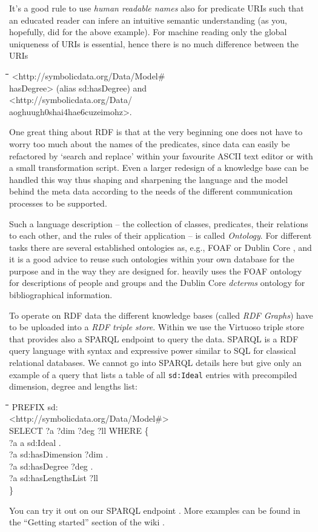 \documentclass[a4paper,11pt]{article}
\newenvironment{code}{\par\small\tt\footnotesize \begin{tabbing}
\hskip12pt\=\hskip12pt\=\hskip12pt\=\hskip12pt\=\hskip5cm\=\hskip5cm\=\kill}
{\end{tabbing}\normalsize}
\begin{document}
\begin{multicols}{2}

It's a good rule to use \emph{human readable names} also for predicate URIs
such that an educated reader can infere an intuitive semantic understanding
(as you, hopefully, did for the above example).  For machine reading only the
global uniqueness of URIs is essential, hence there is no much difference
between the URIs
\begin{code}
  <http://symbolicdata.org/Data/Model\#\\\> hasDegree> (\textrm{alias}
  sd:hasDegree) \textrm{and}\\ <http://symbolicdata.org/Data/\\\>
  aoghuugh0shai4hae6cuzeimohz>.
\end{code}
One great thing about RDF is that at the very beginning one does not have to
worry too much about the names of the predicates, since data can easily be
refactored by `search and replace' within your favourite ASCII text editor or
with a small transformation script.  Even a larger redesign of a knowledge base
can be handled this way thus shaping and sharpening the language and the model
behind the meta data according to the needs of the different communication
processes to be supported.

Such a language description -- the collection of classes, predicates, their
relations to each other, and the rules of their application -- is called
\emph{Ontology}. For different tasks there are several established ontologies
as, e.g., FOAF \cite{foaf} or Dublin Core \cite{DCMI}, and it is a good advice
to reuse such ontologies within your own database for the purpose and in the
way they are designed for. {\SD} heavily uses the FOAF ontology for
descriptions of people and groups and the Dublin Core \emph{dcterms} ontology
\cite{dcterms} for bibliographical information.

To operate on RDF data the different knowledge bases (called \emph{RDF
  Graphs}\/) have to be uploaded into a \emph{RDF triple store}. Within {\SD}
we use the Virtuoso triple store \cite{Virtuoso} that provides also a SPARQL
endpoint \cite{sdsparql} to query the data.  SPARQL is a RDF query language
with syntax and expressive power similar to SQL \cite{SQL} for classical
relational databases.  We cannot go into SPARQL details here but give only an
example of a query that lists a table of all \texttt{sd:Ideal} entries with
precompiled dimension, degree and lengths list:
\begin{code}
PREFIX sd: \\\> <http://symbolicdata.org/Data/Model\#>\\
SELECT ?a ?dim ?deg ?ll WHERE \{\+\\
   ?a a sd:Ideal .\\
   ?a sd:hasDimension ?dim .\\
   ?a sd:hasDegree ?deg .\\
   ?a sd:hasLengthsList ?ll\-\\
\}
\end{code}
You can try it out on our SPARQL endpoint \cite{sdsparql}.  More examples can
be found in the ``Getting started'' section of the {\SD} wiki \cite{sdwiki}.


\end{multicols}
\end{document}
